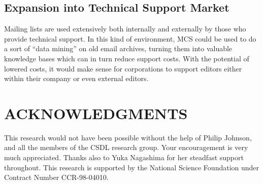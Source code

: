 

\subsection{Expansion into Technical Support Market}
Mailing lists are used extensively both internally and externally by those who
provide technical support. In this kind of environment, MCS could be used to do
a sort of ``data mining'' on old email archives, turning them into valuable
knowledge bases which can in turn reduce support costs. With the potential of
lowered costs, it would make sense for corporations to support editors either
within their company or even external editors.

\section*{ACKNOWLEDGMENTS}
This research would not have been possible without the help of Philip Johnson,
and all the members of the CSDL research group. Your encouragement is very much
appreciated. Thanks also to Yuka Nagashima for her steadfast support
throughout. This research is supported by the National Science Foundation under
Contract Number CCR-98-04010.





